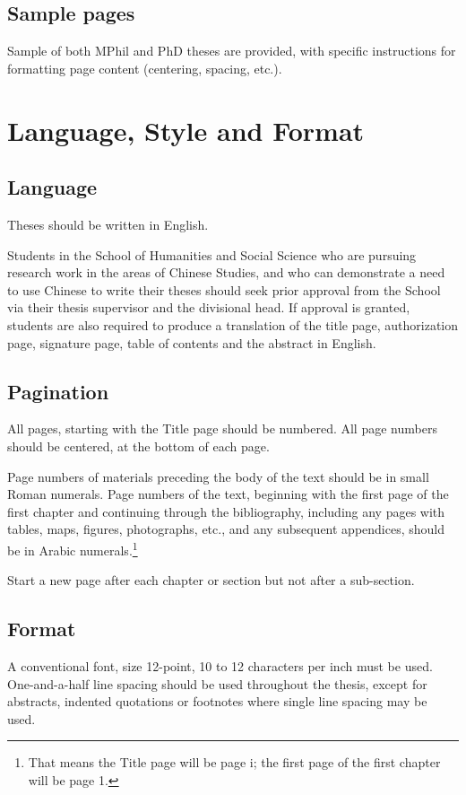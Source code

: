 \subsection{Sample pages}
Sample of both MPhil \citep{mphil} and PhD \citep{phd} theses are provided, with specific instructions for formatting page content (centering, spacing, etc.).

\section{Language, Style and Format}
\subsection{Language}
Theses should be written in English.

Students in the School of Humanities and Social Science who are pursuing research work in the areas of Chinese Studies, and who can demonstrate a need to use Chinese to write their theses should seek prior approval from the School via their thesis supervisor and the divisional head. If approval is granted, students are also required to produce a translation of the title page, authorization page, signature page, table of contents and the abstract in English.

\subsection{Pagination}
All pages, starting with the Title page should be numbered. All page numbers should be centered, at the bottom of each page.

Page numbers of materials preceding the body of the text should be in small Roman numerals. Page numbers of the text, beginning with the first page of the first chapter and continuing through the bibliography, including any pages with tables, maps, figures, photographs, etc., and any subsequent appendices, should be in Arabic numerals.\footnote{That means the Title page will be page i; the first page of the first chapter will be page 1.}

Start a new page after each chapter or section but not after a sub-section.

\subsection{Format}
A conventional font, size 12-point, 10 to 12 characters per inch must be used. One-and-a-half line spacing should be used throughout the thesis, except for abstracts, indented quotations or footnotes where single line spacing may be used.

